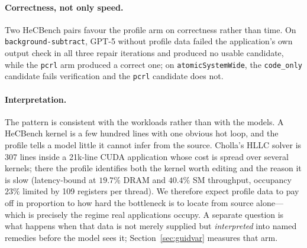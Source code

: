 \paragraph{Correctness, not only speed.}
Two HeCBench pairs favour the profile arm on correctness rather than time. On
\texttt{background-subtract}, GPT-5 without profile data failed the application's own output check in
all three repair iterations and produced no usable candidate, while the \texttt{pcrl} arm produced a
correct one; on \texttt{atomicSystemWide}, the \texttt{code\_only} candidate fails verification and the
\texttt{pcrl} candidate does not.

\paragraph{Interpretation.}
The pattern is consistent with the workloads rather than with the models. A HeCBench kernel is a few
hundred lines with one obvious hot loop, and the profile tells a model little it cannot infer from the
source. Cholla's HLLC solver is 307 lines inside a 21k-line CUDA application whose cost is spread over
several kernels; there the profile identifies both the kernel worth editing and the reason it is slow
(latency-bound at $19.7\%$ DRAM and $40.4\%$ SM throughput, occupancy $23\%$ limited by 109 registers
per thread). We therefore expect profile data to pay off in proportion to how hard the bottleneck is to
locate from source alone---which is precisely the regime real applications occupy.
A separate question is what happens when that data is not merely supplied but \emph{interpreted} into
named remedies before the model sees it; Section~\ref{sec:guidvar} measures that arm.
